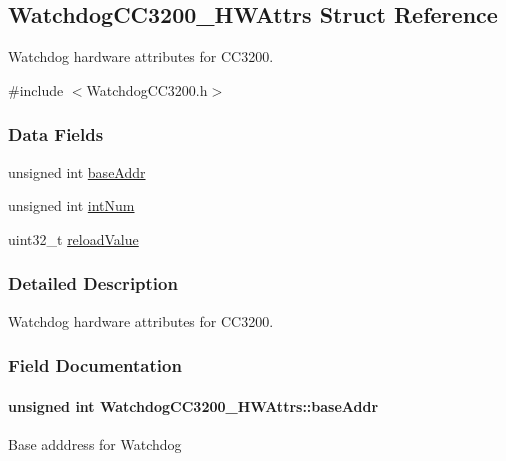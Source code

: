 \subsection{Watchdog\-C\-C3200\-\_\-\-H\-W\-Attrs Struct Reference}
\label{struct_watchdog_c_c3200___h_w_attrs}


Watchdog hardware attributes for C\-C3200.  




{\ttfamily \#include $<$Watchdog\-C\-C3200.\-h$>$}

\subsubsection*{Data Fields}
\begin{DoxyCompactItemize}
\item 
unsigned int \hyperlink{struct_watchdog_c_c3200___h_w_attrs_a008443f1add564e22b829e525cd4505f}{base\-Addr}
\item 
unsigned int \hyperlink{struct_watchdog_c_c3200___h_w_attrs_a49a550cfb37091acc532cfe0330a1c15}{int\-Num}
\item 
uint32\-\_\-t \hyperlink{struct_watchdog_c_c3200___h_w_attrs_a746d7acdd50828840459d4d78171d780}{reload\-Value}
\end{DoxyCompactItemize}


\subsubsection{Detailed Description}
Watchdog hardware attributes for C\-C3200. 

\subsubsection{Field Documentation}
\paragraph[{base\-Addr}]{\setlength{\rightskip}{0pt plus 5cm}unsigned int Watchdog\-C\-C3200\-\_\-\-H\-W\-Attrs\-::base\-Addr}\label{struct_watchdog_c_c3200___h_w_attrs_a008443f1add564e22b829e525cd4505f}
Base adddress for Watchdog 

